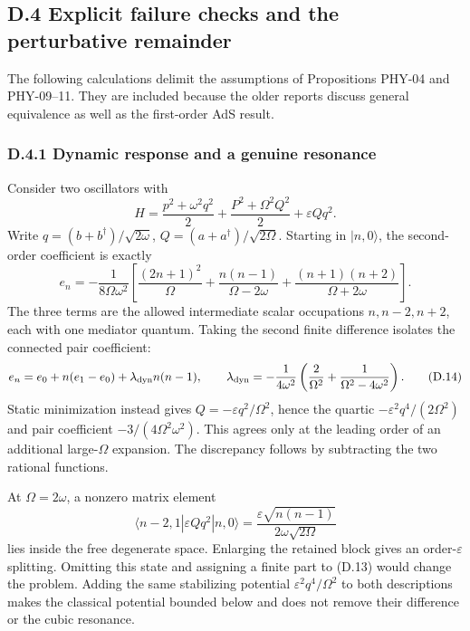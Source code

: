 \hypertarget{d.4-explicit-failure-checks-and-the-perturbative-remainder}{%
\subsection{D.4 Explicit failure checks and the perturbative remainder}\label{d.4-explicit-failure-checks-and-the-perturbative-remainder}}

The following calculations delimit the assumptions of Propositions PHY-04 and PHY-09--11. They are included because the older reports discuss general equivalence as well as the first-order AdS result.

\hypertarget{d.4.1-dynamic-response-and-a-genuine-resonance}{%
\subsubsection{D.4.1 Dynamic response and a genuine resonance}\label{d.4.1-dynamic-response-and-a-genuine-resonance}}

Consider two oscillators with \[
H=\frac{p^2+\omega^2q^2}{2}
+\frac{P^2+\Omega^2Q^2}{2}+\varepsilon Qq^2.
\tag{D.12}
\] Write \(q=(b+b^\dagger)/\sqrt{2\omega}\), \(Q=(a+a^\dagger)/\sqrt{2\Omega}\). Starting in \(|n,0\rangle\), the second-order coefficient is exactly \[
e_n=-\frac1{8\Omega\omega^2}
\left[\frac{(2n+1)^2}{\Omega}
+\frac{n(n-1)}{\Omega-2\omega}
+\frac{(n+1)(n+2)}{\Omega+2\omega}\right].
\tag{D.13}
\] The three terms are the allowed intermediate scalar occupations \(n,n-2,n+2\), each with one mediator quantum. Taking the second finite difference isolates the connected pair coefficient: \[
e_n=e_0+n(e_1-e_0)+\lambda_{\rm dyn}n(n-1),\qquad
\lambda_{\rm dyn}=-\frac1{4\omega^2}
\left(\frac2{\Omega^2}+\frac1{\Omega^2-4\omega^2}\right).
\tag{D.14}
\] Static minimization instead gives \(Q=-\varepsilon q^2/\Omega^2\), hence the quartic \(-\varepsilon^2q^4/(2\Omega^2)\) and pair coefficient \(-3/(4\Omega^2\omega^2)\). This agrees only at the leading order of an additional large-\(\Omega\) expansion. The discrepancy follows by subtracting the two rational functions.

At \(\Omega=2\omega\), a nonzero matrix element \[
\langle n-2,1|\varepsilon Qq^2|n,0\rangle
=\frac{\varepsilon\sqrt{n(n-1)}}{2\omega\sqrt{2\Omega}}
\tag{D.15}
\] lies inside the free degenerate space. Enlarging the retained block gives an order-\(\varepsilon\) splitting. Omitting this state and assigning a finite part to (D.13) would change the problem. Adding the same stabilizing potential \(\varepsilon^2q^4/\Omega^2\) to both descriptions makes the classical potential bounded below and does not remove their difference or the cubic resonance.


